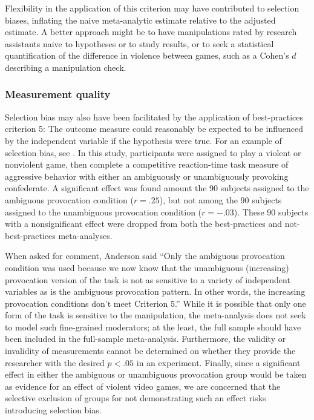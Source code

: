 \documentclass[man]{apa6}
\begin{document}
Flexibility in the application of this criterion may have contributed to selection biases, inflating the naive meta-analytic estimate relative to the adjusted estimate. A better approach might be to have manipulations rated by research assistants naive to hypotheses or to study results, or to seek a statistical quantification of the difference in violence between games, such as a Cohen's $d$ describing a manipulation check.

\subsubsection{Measurement quality}
Selection bias may also have been facilitated by the application of best-practices criterion 5: The outcome measure could reasonably be expected to be influenced by the independent variable if the hypothesis were true. For an example of selection bias, see \citet[study 2]{Anderson:etal:2004}. In this study, participants were assigned to play a violent or nonviolent game, then complete a competitive reaction-time task measure of aggressive behavior with either an ambiguously or unambiguously provoking confederate. A significant effect was found amount the 90  subjects assigned to the ambiguous provocation condition ($r = .25$), but not among the 90 subjects assigned to the unambiguous provocation condition ($r = -.03$). These 90 subjects with a nonsignificant effect were dropped from both the best-practices and not-best-practices meta-analyses. 

When asked for comment, Anderson said ``Only the ambiguous provocation condition was used because we now know that the unambiguous (increasing) provocation version of the task is not as sensitive to a variety of independent variables as is the ambiguous provocation pattern. In other words, the increasing provocation conditions don't meet Criterion 5.'' While it is possible that only one form of the task is sensitive to the manipulation, the meta-analysis does not seek to model such fine-grained moderators; at the least, the full sample should have been included in the full-sample meta-analysis. Furthermore, the validity or invalidity of measurements cannot be determined on whether they provide the researcher with the desired $p<.05$ in an experiment. Finally, since a significant effect in either the ambiguous or unambiguous provocation group would be taken as evidence for an effect of violent video games, we are concerned that the selective exclusion of groups for not demonstrating such an effect risks introducing selection bias.
\end{document}
